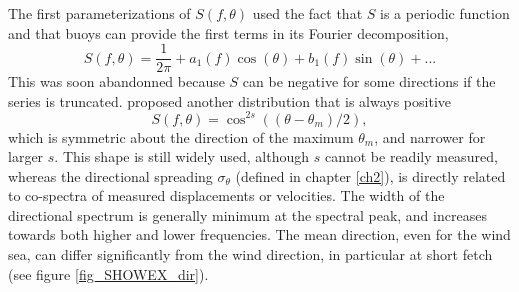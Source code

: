 The first parameterizations of $S(f,\theta)$ used the fact that $S$ is a periodic function 
and that buoys can provide the first terms in its Fourier decomposition, 
\begin{equation}
S(f,\theta)=\frac{1}{2\pi} + a_1(f) \cos(\theta) + b_1(f) \sin(\theta) + ... 
\end{equation}
This was soon abandonned because $S$ can be negative for some directions if the series is truncated. \cite{Longuet-Higgins&al.1963} proposed 
another distribution that is always positive  
\begin{equation}
   S(f,\theta)=\cos^{2s}\left((\theta-\theta_m)/2\right),
\end{equation}
which is symmetric about the direction of the maximum $\theta_m$, and narrower for larger $s$. This shape is still widely used, 
although $s$ cannot be readily measured, whereas the directional spreading  $\sigma_\theta$ (defined in 
chapter \ref{ch2}), is directly related to co-spectra of measured displacements or velocities. 
The width of the directional spectrum is generally minimum at the spectral peak, and increases towards both higher 
and lower frequencies.  The mean direction, even for the wind sea, can differ significantly from the wind direction, 
in particular at short fetch (see figure
\ref{fig_SHOWEX_dir}).

